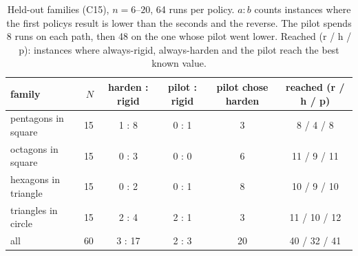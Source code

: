 \begin{table}[t]\centering\small
\begin{tabular}{lrcccc}
\toprule
family & $N$ & harden : rigid & pilot : rigid & pilot chose harden & reached (r / h / p) \\
\midrule
pentagons in square & 15 & 1 : 8 & 0 : 1 & 3 & 8 / 4 / 8 \\
octagons in square & 15 & 0 : 3 & 0 : 0 & 6 & 11 / 9 / 11 \\
hexagons in triangle & 15 & 0 : 2 & 0 : 1 & 8 & 10 / 9 / 10 \\
triangles in circle & 15 & 2 : 4 & 2 : 1 & 3 & 11 / 10 / 12 \\
\midrule
all & 60 & 3 : 17 & 2 : 3 & 20 & 40 / 32 / 41 \\
\bottomrule
\end{tabular}
\caption{Held-out families (C15), $n=6$--$20$, 64 runs per policy. $a:b$ counts instances where the first policy\textquotesingle s result is lower than the second\textquotesingle s and the reverse. The pilot spends 8 runs on each path, then 48 on the one whose pilot went lower. Reached (r / h / p): instances where always-rigid, always-harden and the pilot reach the best known value.}
\label{tab:decision}
\end{table}
